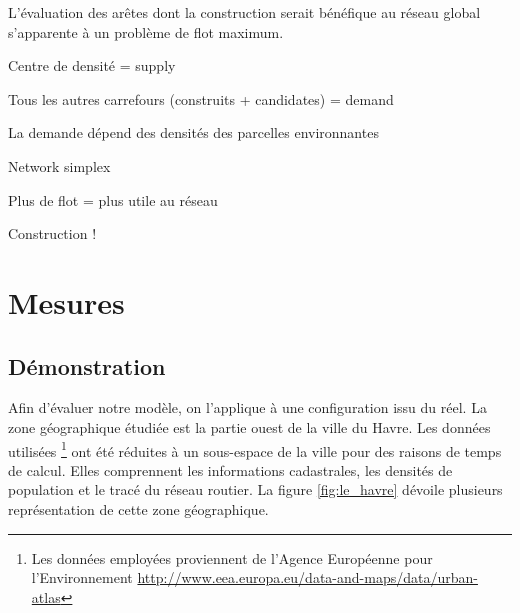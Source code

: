 \documentclass[12pt]{article}
\begin{document}
L'évaluation des arêtes dont la construction serait bénéfique au
réseau global s'apparente à un problème de flot maximum.

Centre de densité = supply

Tous les autres carrefours (construits + candidates) = demand

La demande dépend des densités des parcelles environnantes

Network simplex

Plus de flot = plus utile au réseau

Construction !

\begin{figure}[H]
  \centering
  
  \caption{}
  \label{}
\end{figure}

\section{Mesures}

\subsection{Démonstration}

Afin d'évaluer notre modèle, on l'applique à une configuration issu du
réel. La zone géographique étudiée est la partie ouest de la ville du
Havre. Les données utilisées \footnote{Les données employées
  proviennent de l'Agence Européenne pour l'Environnement
  \url{http://www.eea.europa.eu/data-and-maps/data/urban-atlas}} ont
été réduites à un sous-espace de la ville pour des raisons de temps de
calcul. Elles comprennent les informations cadastrales, les densités
de population et le tracé du réseau routier. La figure
\ref{fig:le_havre} dévoile plusieurs représentation de cette zone
géographique.
\end{document}
